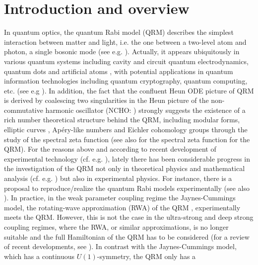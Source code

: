 \documentclass[11pt]{article}
\numberwithin{equation}{section}
\theoremstyle{plain}
\theoremstyle{definition}
\theoremstyle{remark}
\begin{document}
\setcounter{tocdepth}{2}
\tableofcontents

\section{Introduction and overview}

In quantum optics, the quantum Rabi model (QRM) \cite{JC1963} describes the simplest interaction between matter and light,
i.e. the one between a two-level atom and photon, a single bosonic mode (see e.g. \cite{bcbs2016,Le2016}).
Actually, it appears ubiquitously in various quantum systems including cavity and circuit quantum electrodynamics,
quantum dots and artificial atoms \cite{YS2018}, with potential applications in quantum information technologies
including quantum cryptography, quantum computing, etc. (see e.g \cite{BMSSRWU2017,HR2008}).
In addition, the fact \cite{W2015IMRN} that the confluent Heun ODE picture of QRM is derived by coalescing two singularities in the Heun picture of the
non-commutative harmonic oscillator (NCHO: \cite{P2010S,PW2001}) strongly suggests the existence of a rich number theoretical structure
behind the QRM, including modular forms, elliptic curves \cite{KW2007}, Ap\'ery-like numbers \cite{KW2006KJM,LOS2016PAMS}
and Eichler cohomology groups \cite{KW2012RIMS,KW2019} through the study of the spectral zeta function \cite{IW2005a,IW2005KJM,O2008RJ}
(see also \cite{Sugi2016} for the spectral zeta function for the QRM). For the reasons above and according to recent development of experimental technology (cf. e.g. \cite{Ni2010}),
lately there has been considerable progress in the investigation of the QRM
not only in theoretical physics and mathematical analysis (cf.  e.g. \cite{HH2012,H2009IUMJ,P2014Milan,Sugi2016})
but also in experimental physics. For instance, there is a proposal to reproduce/realize the quantum Rabi models experimentally \cite{Pe2015SR}
(see also \cite{Lv2017}). In practice, in the weak parameter coupling regime  the Jaynes-Cummings model, the rotating-wave approximation (RWA)
of the QRM \cite{JC1963}, experimentally meets the QRM.
However, this is not the case in the ultra-strong and deep strong coupling regimes, where the RWA, or similar approximations, is no longer suitable
and the full Hamiltonian of the QRM has to be considered (for a review of recent developments, see \cite{Le2016}).
In contrast with the Jaynes-Cummings model, which has a continuous $U(1)$-symmetry, the QRM only has a
\end{document}
